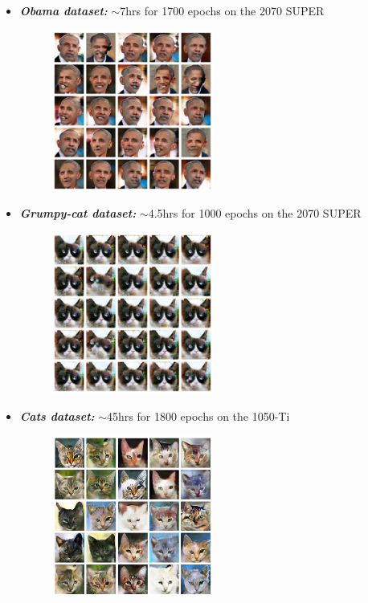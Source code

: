 \documentclass[12pt]{article}
\begin{document}
\begin{itemize}
	\item {
		\textbf{\textit{Obama dataset:}} $\sim$7hrs for 1700 epochs on the 2070 SUPER
		\begin{figure}[H]
			\centering
			\includegraphics[width=0.5\textwidth]{Images/obama_exp.jpg}
		\end{figure}
	}
	\item {
		\textbf{\textit{Grumpy-cat dataset:}} $\sim$4.5hrs for 1000 epochs on the 2070 SUPER
		\begin{figure}[H]
			\centering
			\includegraphics[width=0.5\textwidth]{Images/grumpy_exp.jpg}
		\end{figure}
	}
	\vspace*{4cm}
	\item {
		\textbf{\textit{Cats dataset:}} $\sim$45hrs for 1800 epochs on the 1050-Ti
		\begin{figure}[H]
			\centering
			\includegraphics[width=0.5\textwidth]{Images/cats_exp.png}
		\end{figure}
	}
\end{itemize} 
\end{document}
